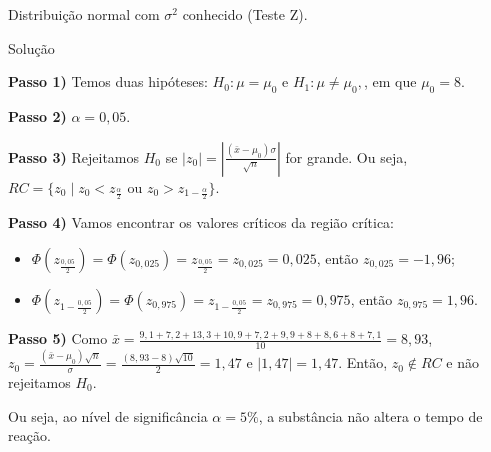 \documentclass[8pt]{beamer}
\begin{document}
\begin{frame}{Distribuição normal com $\sigma^2$ conhecido (Teste Z).}

\begin{block}{Solução}

\textbf{Passo 1)} Temos duas hipóteses: $H_0:  \mu = \mu_0$ e $H_1:  \mu \neq \mu_0,$, em que $\mu_0=8$.

\textbf{Passo 2)} $\alpha = 0,05$.

\textbf{Passo 3)} Rejeitamos $H_0$ se $\lvert z_0 \rvert = \left\lvert \frac{(\bar{x} - \mu_0)\sigma}{\sqrt{n}} \right\rvert$ for grande. Ou seja, $RC = \{z_0 \mid z_0 < z_\frac{\alpha}{2} \mbox{ ou } z_0 > z_{1-\frac{\alpha}{2}} \}.$


\textbf{Passo 4)} Vamos encontrar os valores críticos da região crítica:
\begin{itemize}
	\item $\Phi\left(z_\frac{0,05}{2}\right)= \Phi\left(z_{0,025}\right) = z_\frac{0,05}{2}= z_{0,025} =0,025$, então $z_{0,025}=-1,96$;
	\item $\Phi\left(z_{1-\frac{0,05}{2}}\right)= \Phi\left(z_{0,975}\right) = z_{1-\frac{0,05}{2}}= z_{0,975} =0,975$, então $z_{0,975}=1,96$.
\end{itemize}

\textbf{Passo 5)} Como $\bar{x} = \frac{9,1+7,2+13,3+10,9+7,2+9,9+8+8,6+8+7,1}{10} = 8,93$, $z_0 = \frac{(\bar{x}- \mu_0)\sqrt{n}}{\sigma} = \frac{(8,93 - 8)\sqrt{10}}{2} = 1,47$ e $\lvert 1,47 \rvert = 1,47$. Então, $z_0 \not\in RC$ e não rejeitamos $H_0$.
\vfill

Ou seja, ao nível de significância $\alpha=5\%$, a substância não altera o tempo de reação.
	
\end{block}

\end{frame}
\end{document}
